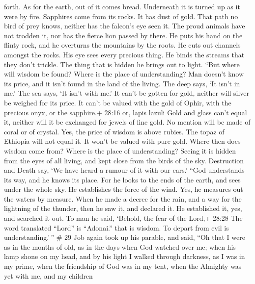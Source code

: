 forth.  As for the earth, out of it comes bread. Underneath
it is turned up as it were by fire.  Sapphires come from its
rocks. It has dust of gold.  That path no bird of prey
knows, neither has the falcon's eye seen it.  The proud
animals have not trodden it, nor has the fierce lion passed by there.
 He puts his hand on the flinty rock, and he overturns the
mountains by the roots.  He cuts out channels amongst the
rocks. His eye sees every precious thing.  He binds the
streams that they don't trickle. The thing that is hidden he brings out
to light.  ``But where will wisdom be found? Where is the
place of understanding?  Man doesn't know its price, and it
isn't found in the land of the living.  The deep says, `It
isn't in me.' The sea says, `It isn't with me.'  It can't
be gotten for gold, neither will silver be weighed for its price.
 It can't be valued with the gold of Ophir, with the
precious onyx, or the sapphire.+ 28:16 or, lapis lazuli 
Gold and glass can't equal it, neither will it be exchanged for jewels
of fine gold.  No mention will be made of coral or of
crystal. Yes, the price of wisdom is above rubies.  The
topaz of Ethiopia will not equal it. It won't be valued with pure gold.
 Where then does wisdom come from? Where is the place of
understanding?  Seeing it is hidden from the eyes of all
living, and kept close from the birds of the sky. 
Destruction and Death say, `We have heard a rumour of it with our ears.'
 ``God understands its way, and he knows its place.
 For he looks to the ends of the earth, and sees under the
whole sky.  He establishes the force of the wind. Yes, he
measures out the waters by measure.  When he made a decree
for the rain, and a way for the lightning of the thunder, 
then he saw it, and declared it. He established it, yes, and searched it
out.  To man he said, `Behold, the fear of the Lord,+ 28:28
The word translated ``Lord'' is ``Adonai.'' that is wisdom. To depart
from evil is understanding.'\,'' \# 29  Job again took up
his parable, and said,  ``Oh that I were as in the months of
old, as in the days when God watched over me;  when his lamp
shone on my head, and by his light I walked through darkness,
 as I was in my prime, when the friendship of God was in my
tent,  when the Almighty was yet with me, and my children
